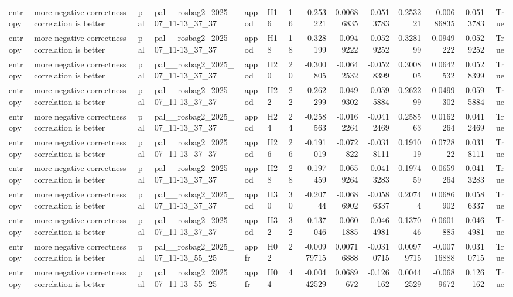 \begin{longtable}{llllllrrrrrrrr}
entropy & more negative correctness correlation is better & pal & pal\_\_rosbag2\_2025\_07\_11-13\_37\_37 & appod & H16 & 16 & -0.253221 & 0.00686835 & -0.0513783 & 0.253221 & -0.00686835 & 0.0513783 & True \\
entropy & more negative correctness correlation is better & pal & pal\_\_rosbag2\_2025\_07\_11-13\_37\_37 & appod & H18 & 18 & -0.328199 & -0.0949222 & -0.0529252 & 0.328199 & 0.0949222 & 0.0529252 & True \\
entropy & more negative correctness correlation is better & pal & pal\_\_rosbag2\_2025\_07\_11-13\_37\_37 & appod & H20 & 20 & -0.300805 & -0.0642532 & -0.0528399 & 0.300805 & 0.0642532 & 0.0528399 & True \\
entropy & more negative correctness correlation is better & pal & pal\_\_rosbag2\_2025\_07\_11-13\_37\_37 & appod & H22 & 22 & -0.262299 & -0.0499302 & -0.0595884 & 0.262299 & 0.0499302 & 0.0595884 & True \\
entropy & more negative correctness correlation is better & pal & pal\_\_rosbag2\_2025\_07\_11-13\_37\_37 & appod & H24 & 24 & -0.258563 & -0.0162264 & -0.0412469 & 0.258563 & 0.0162264 & 0.0412469 & True \\
entropy & more negative correctness correlation is better & pal & pal\_\_rosbag2\_2025\_07\_11-13\_37\_37 & appod & H26 & 26 & -0.191019 & -0.072822 & -0.0318111 & 0.191019 & 0.072822 & 0.0318111 & True \\
entropy & more negative correctness correlation is better & pal & pal\_\_rosbag2\_2025\_07\_11-13\_37\_37 & appod & H28 & 28 & -0.197459 & -0.0659264 & -0.0413283 & 0.197459 & 0.0659264 & 0.0413283 & True \\
entropy & more negative correctness correlation is better & pal & pal\_\_rosbag2\_2025\_07\_11-13\_37\_37 & appod & H30 & 30 & -0.20744 & -0.0686902 & -0.0586337 & 0.20744 & 0.0686902 & 0.0586337 & True \\
entropy & more negative correctness correlation is better & pal & pal\_\_rosbag2\_2025\_07\_11-13\_37\_37 & appod & H32 & 32 & -0.137046 & -0.0601885 & -0.0464981 & 0.137046 & 0.0601885 & 0.0464981 & True \\
entropy & more negative correctness correlation is better & pal & pal\_\_rosbag2\_2025\_07\_11-13\_55\_25 & appfr & H02 & 2 & -0.00979715 & 0.00716888 & -0.0310715 & 0.00979715 & -0.00716888 & 0.0310715 & True \\
entropy & more negative correctness correlation is better & pal & pal\_\_rosbag2\_2025\_07\_11-13\_55\_25 & appfr & H04 & 4 & -0.00442529 & 0.0689672 & -0.126162 & 0.00442529 & -0.0689672 & 0.126162 & True \\

\end{longtable}
